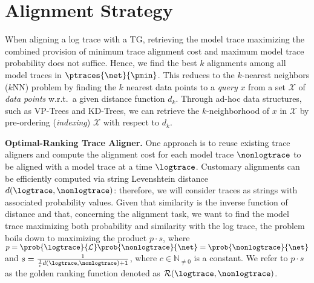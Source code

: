 \section{Alignment Strategy}\label{subsec:as}

When aligning a log trace with a TG, retrieving the model trace maximizing the combined provision of minimum trace alignment cost 
and maximum model trace probability does not suffice.
Hence, we find the best $k$ alignments among all  model traces in $\ptraces{\net}{\pmin}$. This reduces to the
$k$-nearest neighbors ($k$NN) problem by finding the $k$ nearest data points to a \textit{query} $x$ from a set 
$\mathcal{X}$ of \textit{data points} w.r.t.\ a given distance function $d_k$. Through ad-hoc data structures, such as VP-Trees 
and KD-Trees, %
we can retrieve the $k$-neighborhood of $x$ in $\mathcal{X}$ by pre-ordering (\textit{indexing}) $\mathcal{X}$ with respect to $d_k$. 
%

\smallskip
\noindent
\textbf{Optimal-Ranking Trace Aligner.}
One approach is to reuse existing trace aligners and compute the alignment cost for each model trace $\nonlogtrace$ to be aligned with a model trace at a time $\logtrace$. Customary alignments \cite{DBLP:conf/edoc/AdriansyahDA11,LeoniM17} can be efficiently computed via string Levenshtein distance $d(\logtrace,\nonlogtrace)$: therefore, we will consider traces as strings with associated probability values. Given that similarity is the inverse function of distance and that, concerning the alignment task, we want to find the model trace maximizing both probability and similarity with the log trace, the problem boils down to maximizing the product $p\cdot s$, where $p=\prob{\logtrace}{\mathcal{L}}\prob{\nonlogtrace}{\net}=\prob{\nonlogtrace}{\net}$ and $s=\frac{1}{\frac{1}{c}d(\logtrace, \nonlogtrace)+1}$, where $c\in\mathbb{N}_{\neq 0}$ is a constant. We refer to $p\cdot s$ as the golden ranking function denoted as $\mathcal{R}(\logtrace,\nonlogtrace)$.


